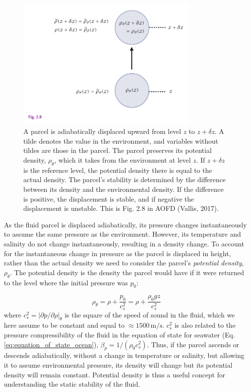 \documentclass[12pt]{article}
\numberwithin{equation}{section}
\numberwithin{figure}{section}
\numberwithin{table}{section}
\begin{document}
\begin{figure}[h]
  \centering
  \includegraphics[width=0.8\textwidth]{assets/fig_static_instability.pdf}
  \caption{
    A parcel is adiabatically displaced upward from level $z$ to $z + \delta z$.
    A tilde denotes the value in the environment, and variables without tildes
    are those in the parcel.
    The parcel preserves its potential density, $\rho_\theta$, which it takes
    from the environment at level $z$.
    If $z + \delta z$ is the reference level, the potential density there is
    equal to the actual density.
    The parcel's stability is determined by the difference between its density
    and the environmental density.
    If the difference is positive, the displacement is stable, and if negative
    the displacement is unstable.
    This is Fig. 2.8 in AOFD (Vallis, 2017).
  }
  \label{fig:static_instability}
\end{figure}

As the fluid parcel is displaced adiabatically, its pressure changes
instantaneously to assume the same pressure as the environment.
However, its temperature and salinity do not change instantaneously, resulting
in a density change.
To account for the instantaneous change in pressure as the parcel is displaced
in height, rather than the actual density we need to consider the parcel's
\textit{potential density}, $\rho_\theta$.
The potential density is the density the parcel would have if it were returned
to the level where the initial pressure was $p_0$:

\begin{equation}
  \rho_\theta = \rho + \frac{p_0}{c_s^2} = \rho + \frac{\rho_0 g z}{c_s^2}
  \label{eq:potential_density}
\end{equation}
where $c_s^2 = \left| \partial p / \partial \rho \right|_\theta$ is the square of
the speed of sound in the fluid, which we here assume to be constant and equal
to $\approx 1500 \, \text{m/s}$.
$c_s^2$ is also related to the pressure compressibility of the fluid in the
equation of state for seawater (Eq. \ref{eq:equation_of_state_ocean}),
$\beta_p = 1/(\rho_0 c_s^2)$.
Thus, if the parcel ascends or descends adiabatically, without a change in
temperature or salinity, but allowing it to assume environmental pressure,
its density will change but its potential density will remain constant.
Potential density is thus a useful concept for understanding the static stability
of the fluid.
\end{document}
